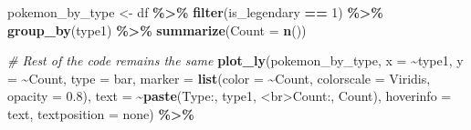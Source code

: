 \documentclass[
]{article}
\newenvironment{Shaded}{\begin{snugshade}}{\end{snugshade}}
\newcommand{\AttributeTok}[1]{\textcolor[rgb]{0.13,0.29,0.53}{#1}}
\newcommand{\CommentTok}[1]{\textcolor[rgb]{0.56,0.35,0.01}{\textit{#1}}}
\newcommand{\DecValTok}[1]{\textcolor[rgb]{0.00,0.00,0.81}{#1}}
\newcommand{\FloatTok}[1]{\textcolor[rgb]{0.00,0.00,0.81}{#1}}
\newcommand{\FunctionTok}[1]{\textcolor[rgb]{0.13,0.29,0.53}{\textbf{#1}}}
\newcommand{\NormalTok}[1]{#1}
\newcommand{\OtherTok}[1]{\textcolor[rgb]{0.56,0.35,0.01}{#1}}
\newcommand{\SpecialCharTok}[1]{\textcolor[rgb]{0.81,0.36,0.00}{\textbf{#1}}}
\newcommand{\StringTok}[1]{\textcolor[rgb]{0.31,0.60,0.02}{#1}}
\begin{document}
\begin{Shaded}
\begin{Highlighting}[]
\NormalTok{pokemon\_by\_type }\OtherTok{\textless{}{-}}\NormalTok{ df }\SpecialCharTok{\%\textgreater{}\%}
  \FunctionTok{filter}\NormalTok{(is\_legendary }\SpecialCharTok{==} \DecValTok{1}\NormalTok{) }\SpecialCharTok{\%\textgreater{}\%}
  \FunctionTok{group\_by}\NormalTok{(type1) }\SpecialCharTok{\%\textgreater{}\%}
  \FunctionTok{summarize}\NormalTok{(}\AttributeTok{Count =} \FunctionTok{n}\NormalTok{())}

\CommentTok{\# Rest of the code remains the same}
\FunctionTok{plot\_ly}\NormalTok{(pokemon\_by\_type, }\AttributeTok{x =} \SpecialCharTok{\textasciitilde{}}\NormalTok{type1, }\AttributeTok{y =} \SpecialCharTok{\textasciitilde{}}\NormalTok{Count,}
        \AttributeTok{type =} \StringTok{\textquotesingle{}bar\textquotesingle{}}\NormalTok{,}
        \AttributeTok{marker =} \FunctionTok{list}\NormalTok{(}\AttributeTok{color =} \SpecialCharTok{\textasciitilde{}}\NormalTok{Count, }\AttributeTok{colorscale =} \StringTok{\textquotesingle{}Viridis\textquotesingle{}}\NormalTok{, }\AttributeTok{opacity =} \FloatTok{0.8}\NormalTok{),}
        \AttributeTok{text =} \SpecialCharTok{\textasciitilde{}}\FunctionTok{paste}\NormalTok{(}\StringTok{\textquotesingle{}Type:\textquotesingle{}}\NormalTok{, type1, }\StringTok{\textquotesingle{}\textless{}br\textgreater{}Count:\textquotesingle{}}\NormalTok{, Count),}
        \AttributeTok{hoverinfo =} \StringTok{\textquotesingle{}text\textquotesingle{}}\NormalTok{,}
        \AttributeTok{textposition =} \StringTok{\textquotesingle{}none\textquotesingle{}}\NormalTok{) }\SpecialCharTok{\%\textgreater{}\%}


\end{Highlighting}
\end{Shaded}
\end{document}
